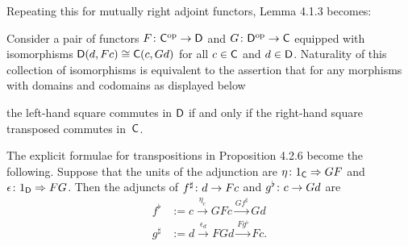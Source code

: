 \documentclass[../../solutions]{subfiles}
\begin{document}
\bigskip

Repeating this for mutually right adjoint functors, Lemma 4.1.3
becomes:
\begingroup
\renewcommand{\theHtheorem}{\theHsection.\arabic{theorem}.right}
\begin{lemma}
  Consider a pair of functors ${F}\colon{{\mathsf{C}}^{\mathrm{op}}}\to{{\mathsf{D}}}$ and
  ${G}\colon{{\mathsf{D}}^{\mathrm{op}}}\to{{\mathsf{C}}}$ equipped with isomorphisms
  ${\mathsf{D}}(d,Fc)\cong {\mathsf{C}}(c,Gd)$ for all $c\in{\mathsf{C}}$ and $d\in{\mathsf{D}}$.
  Naturality of this collection of isomorphisms is equivalent to the
  assertion that for any morphisms with domains and codomains as
  displayed below
  \begin{center}
  \end{center}
  the left-hand square commutes in ${\mathsf{D}}$ if and only if the
  right-hand square transposed commutes in~${\mathsf{C}}$.
\end{lemma}
\popthm
\endgroup

The explicit formulae for transpositions in Proposition 4.2.6 become
the following.  Suppose that the units of the adjunction are
${\eta}\colon{1_{\mathsf{C}}}\Rightarrow{GF}$ and ${\epsilon}\colon{1_{\mathsf{D}}}\Rightarrow{FG}$.  Then the
adjuncts of ${f^\sharp}\colon{d}\to{Fc}$ and ${g^\flat}\colon{c}\to{Gd}$ are
\begin{align*}
  f^\flat &:= c \xrightarrow{\eta_c} GFc \xrightarrow{Gf^\sharp} Gd \\
  g^\sharp &:= d \xrightarrow{\epsilon_d} FGd \xrightarrow{Fg^\flat} Fc.
\end{align*}
\end{document}
